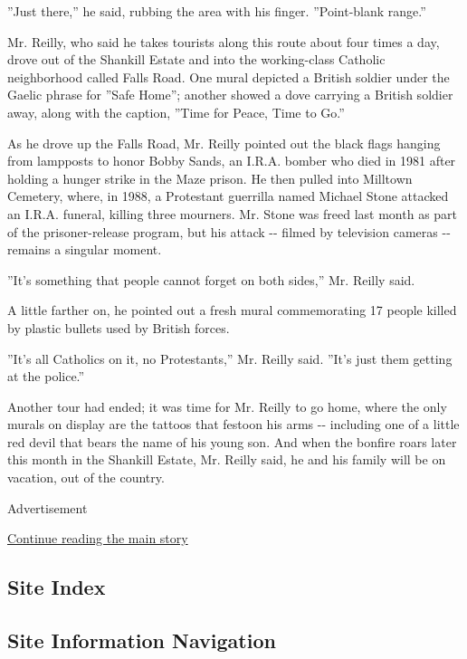 ''Just there,'' he said, rubbing the area with his finger. ''Point-blank
range.''

Mr. Reilly, who said he takes tourists along this route about four times
a day, drove out of the Shankill Estate and into the working-class
Catholic neighborhood called Falls Road. One mural depicted a British
soldier under the Gaelic phrase for ''Safe Home''; another showed a dove
carrying a British soldier away, along with the caption, ''Time for
Peace, Time to Go.''

As he drove up the Falls Road, Mr. Reilly pointed out the black flags
hanging from lampposts to honor Bobby Sands, an I.R.A. bomber who died
in 1981 after holding a hunger strike in the Maze prison. He then pulled
into Milltown Cemetery, where, in 1988, a Protestant guerrilla named
Michael Stone attacked an I.R.A. funeral, killing three mourners. Mr.
Stone was freed last month as part of the prisoner-release program, but
his attack -\/- filmed by television cameras -\/- remains a singular
moment.

''It's something that people cannot forget on both sides,'' Mr. Reilly
said.

A little farther on, he pointed out a fresh mural commemorating 17
people killed by plastic bullets used by British forces.

''It's all Catholics on it, no Protestants,'' Mr. Reilly said. ''It's
just them getting at the police.''

Another tour had ended; it was time for Mr. Reilly to go home, where the
only murals on display are the tattoos that festoon his arms -\/-
including one of a little red devil that bears the name of his young
son. And when the bonfire roars later this month in the Shankill Estate,
Mr. Reilly said, he and his family will be on vacation, out of the
country.

Advertisement

\protect\hyperlink{after-bottom}{Continue reading the main story}

\hypertarget{site-index}{%
\subsection{Site Index}\label{site-index}}

\hypertarget{site-information-navigation}{%
\subsection{Site Information
Navigation}\label{site-information-navigation}}

